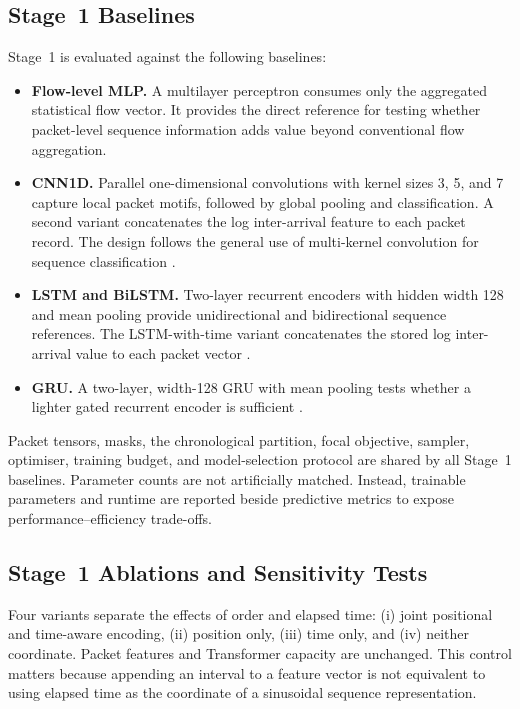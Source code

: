 \documentclass[11pt,fleqn]{report}
\begin{document}
\subsection{Stage~1 Baselines}
\label{subsubsec:stage1_baselines}

Stage~1 is evaluated against the following baselines:

\begin{itemize}[leftmargin=*]
    \item \textbf{Flow-level MLP.} A multilayer perceptron consumes only the aggregated statistical flow vector. It provides the direct reference for testing whether packet-level sequence information adds value beyond conventional flow aggregation.

    \item \textbf{CNN1D.} Parallel one-dimensional convolutions with kernel sizes 3, 5, and 7 capture local packet motifs, followed by global pooling and classification. A second variant concatenates the log inter-arrival feature to each packet record. The design follows the general use of multi-kernel convolution for sequence classification \cite{Kim2014CNN}.

    \item \textbf{LSTM and BiLSTM.} Two-layer recurrent encoders with hidden width 128 and mean pooling provide unidirectional and bidirectional sequence references. The LSTM-with-time variant concatenates the stored log inter-arrival value to each packet vector
    \cite{Hochreiter1997LSTM}.

    \item \textbf{GRU.} A two-layer, width-128 GRU with mean pooling tests whether a lighter gated recurrent encoder is sufficient \cite{Cho2014GRU}.

\end{itemize}

Packet tensors, masks, the chronological partition, focal objective, sampler, optimiser, training budget, and model-selection protocol are shared by all Stage~1 baselines. Parameter counts are not artificially matched. Instead, trainable parameters and runtime are reported beside predictive metrics to expose performance--efficiency trade-offs.

\subsection{Stage~1 Ablations and Sensitivity Tests}
\label{subsubsec:stage1_ablation_protocol}

Four variants separate the effects of order and elapsed time: (i) joint positional and time-aware encoding, (ii) position only, (iii) time only, and (iv) neither coordinate. Packet features and Transformer capacity are unchanged. This control matters because appending an interval to a feature vector is not equivalent to using elapsed time as the coordinate of a sinusoidal sequence representation.
\end{document}
